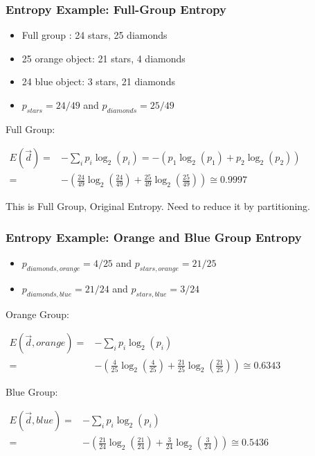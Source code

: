 \begin{frame}[fragile]\frametitle{Entropy Example: Full-Group Entropy}

\begin{itemize}
\item Full group : 24 stars, 25 diamonds
\item 25 orange object: 21 stars, 4 diamonds
\item 24 blue object: 3 stars, 21 diamonds
\item $p_{stars} = 24/49$ and  $p_{diamonds} = 25/49$
\end{itemize}
Full Group:
\begin{center}
\footnotesize
$\displaystyle \begin{aligned}
E(\vec{d}) = {}& -\sum_i p_i \log_2(p_i) = -\left(p_1\log_2(p_1) + p_2\log_2(p_2)\right) \\
= {}& -\left(\frac{24}{49}\log_2\left(\frac{24}{49}\right) + \frac{25}{49}\log_2\left(\frac{25}{49}\right)\right) \cong 0.9997
\end{aligned}$
\end{center}
This is Full Group, Original Entropy. Need to reduce it by partitioning.
\end{frame}

\begin{frame}[fragile]\frametitle{Entropy Example: Orange and Blue Group Entropy}

\begin{itemize}
\item $p_{diamonds, orange} = 4/25$ and  $p_{stars,orange} = 21/25$
\item $p_{diamonds, blue} = 21/24$ and  $p_{stars,blue} = 3/24$
\end{itemize}

Orange Group:
\begin{center}
\footnotesize
$\displaystyle \begin{aligned}
E(\vec{d}, orange) = {}& -\sum_i p_i \log_2(p_i) \\
= {}& -\left(\frac{4}{25}\log_2\left(\frac{4}{25}\right) + \frac{21}{25}\log_2\left(\frac{21}{25}\right)\right) \cong 0.6343
\end{aligned}$
\end{center}
Blue Group:
\begin{center}
\footnotesize
$\displaystyle \begin{aligned}
E(\vec{d}, blue) = {}& -\sum_i p_i \log_2(p_i) \\
= {}& -\left(\frac{21}{24}\log_2\left(\frac{21}{24}\right) + \frac{3}{24}\log_2\left(\frac{3}{24}\right)\right) \cong 0.5436
\end{aligned}$
\end{center}
\end{frame}


